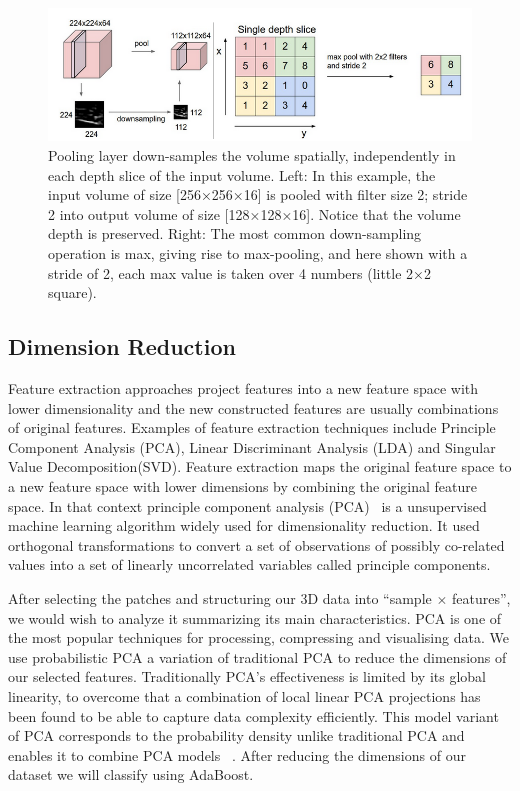 \begin{centering}
	\begin{figure}
		\centering
		\includegraphics[width=\linewidth]{figures/maxpooling2.png}
		\caption[Maxpooling and Downsampeling.]{Pooling layer down-samples the volume spatially, independently in each depth slice of the input volume. Left: In this example, the input volume of size [256×256×16] is pooled with filter size 2; stride 2 into output volume of size [128×128×16]. Notice that the volume depth is preserved. Right: The most common down-sampling operation is max, giving rise to max-pooling, and here shown with a stride of 2, each max value is taken over 4 numbers (little 2×2 square).}
		\label{fig:maxpooling}
	\end{figure}
\end{centering}

\subsection{Dimension Reduction}
Feature extraction approaches project features into a new feature space with lower dimensionality and the new constructed features are usually combinations of original features. Examples of feature extraction techniques include Principle Component Analysis (PCA), Linear Discriminant Analysis (LDA) and Singular Value Decomposition(SVD). Feature extraction maps the original feature space to a new feature space with lower dimensions by combining the original feature space. In that context principle component analysis (PCA)~\citep{jolliffe2002principal} is a unsupervised machine learning algorithm widely used for dimensionality reduction. It used orthogonal transformations to convert a set of observations of possibly co-related values into a set of linearly uncorrelated variables called principle components. 

After selecting the patches and structuring our 3D data into ``sample $ \times $ features'', we would wish to analyze it summarizing its main characteristics. PCA is one of the most popular techniques for processing, compressing and visualising data. We use probabilistic PCA a variation of traditional PCA to reduce the dimensions of our selected features. Traditionally PCA's effectiveness is limited by its global linearity, to overcome that a combination of local linear PCA projections has been found to be able to capture data complexity efficiently. This model variant of PCA corresponds to the probability density unlike traditional PCA and enables it to combine PCA models~ \citep{tipping1999mixtures}. After reducing the dimensions of our dataset we will classify using AdaBoost. 


